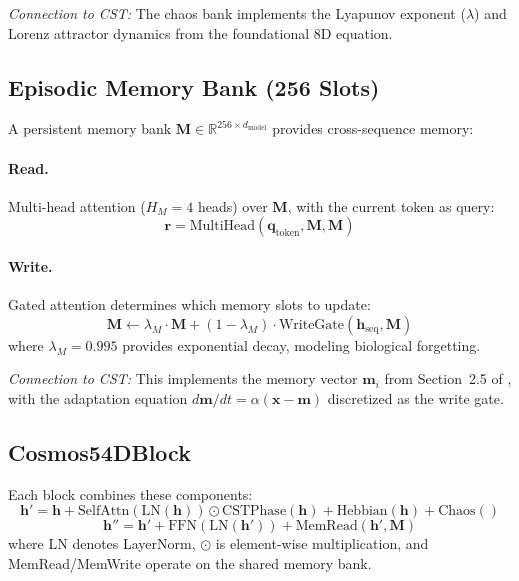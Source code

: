 \documentclass[11pt,a4paper]{article}
\begin{document}
\emph{Connection to CST:} The chaos bank implements the Lyapunov exponent ($\lambda$) and Lorenz attractor dynamics from the foundational 8D equation.

\subsection{Episodic Memory Bank (256 Slots)}
\label{sec:memory-bank}

A persistent memory bank $\mathbf{M} \in \mathbb{R}^{256 \times d_{\text{model}}}$ provides cross-sequence memory:

\paragraph{Read.} Multi-head attention ($H_M = 4$ heads) over $\mathbf{M}$, with the current token as query:
\begin{equation}
    \mathbf{r} = \text{MultiHead}(\mathbf{q}_{\text{token}}, \mathbf{M}, \mathbf{M})
\end{equation}

\paragraph{Write.} Gated attention determines which memory slots to update:
\begin{equation}
    \mathbf{M} \leftarrow \lambda_M \cdot \mathbf{M} + (1 - \lambda_M) \cdot \text{WriteGate}(\mathbf{h}_{\text{seq}}, \mathbf{M})
\end{equation}
where $\lambda_M = 0.995$ provides exponential decay, modeling biological forgetting.

\emph{Connection to CST:} This implements the memory vector $\mathbf{m}_i$ from Section~2.5 of \citet{davis2024cst}, with the adaptation equation $d\mathbf{m}/dt = \alpha(\mathbf{x} - \mathbf{m})$ discretized as the write gate.

\subsection{Cosmos54DBlock}

Each block combines these components:
\begin{equation}
    \mathbf{h}' = \mathbf{h} + \text{SelfAttn}(\text{LN}(\mathbf{h})) \odot \text{CSTPhase}(\mathbf{h}) + \text{Hebbian}(\mathbf{h}) + \text{Chaos}()
\end{equation}
\begin{equation}
    \mathbf{h}'' = \mathbf{h}' + \text{FFN}(\text{LN}(\mathbf{h}')) + \text{MemRead}(\mathbf{h}', \mathbf{M})
\end{equation}
where LN denotes LayerNorm, $\odot$ is element-wise multiplication, and MemRead/MemWrite operate on the shared memory bank.
\end{document}
